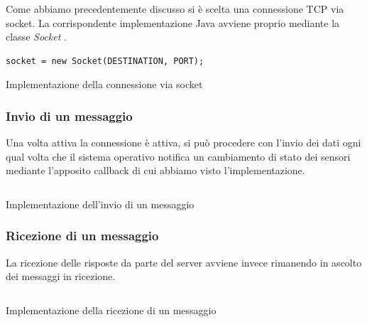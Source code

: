 Come abbiamo precedentemente discusso si è scelta una connessione TCP via socket. La corrispondente implementazione Java
avviene proprio mediante la classe \textit{Socket} \cite{socket}.
\begin{listing}[H] 
    \begin{verbatim}
socket = new Socket(DESTINATION, PORT);
    \end{verbatim}
    \caption{Implementazione della connessione via socket}
\end{listing}

\subsubsection{Invio di un messaggio}
Una volta attiva la connessione è attiva, si può procedere con l'invio dei dati ogni qual volta che il sistema 
operativo notifica un cambiamento di stato dei sensori mediante l'apposito callback 
di cui abbiamo visto l'implementazione.
\begin{listing}[H] 
    \inputminted[frame=single,framesep=10pt]{java}{assets/snippets/app/connection/send.java}
    \caption{Implementazione dell'invio di un messaggio}
\end{listing}

\subsubsection{Ricezione di un messaggio}
La ricezione delle risposte da parte del server avviene invece rimanendo in ascolto 
dei messaggi in ricezione.
\begin{listing}[H] 
    \inputminted[frame=single,framesep=10pt]{java}{assets/snippets/app/connection/receive.java}
    \caption{Implementazione della ricezione di un messaggio}
\end{listing}